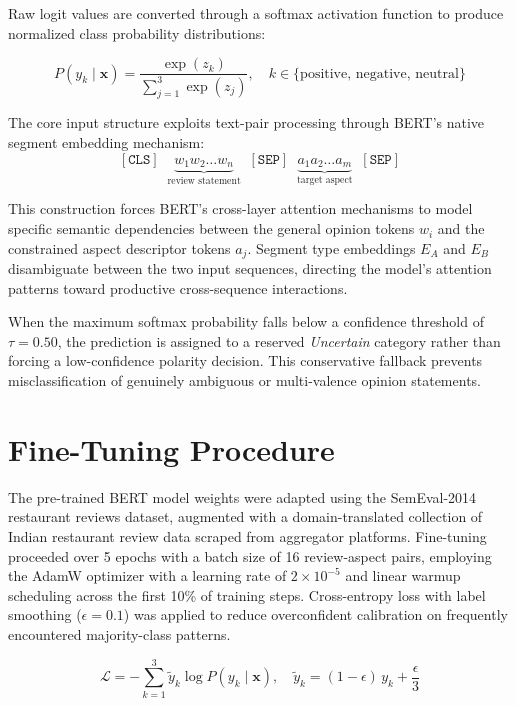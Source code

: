 \documentclass[12pt,a4paper]{report}
\begin{document}
Raw logit values are converted through a softmax activation function to produce normalized class probability distributions:

\begin{equation}
P(y_k \mid \mathbf{x}) = \frac{\exp(z_k)}{\sum_{j=1}^{3} \exp(z_j)}, \quad k \in \{\text{positive, negative, neutral}\}
\end{equation}

The core input structure exploits text-pair processing through BERT's native segment embedding mechanism:
\[
[\texttt{CLS}] \;\; \underbrace{w_1 w_2 \ldots w_n}_{\text{review statement}} \;\;
[\texttt{SEP}] \;\; \underbrace{a_1 a_2 \ldots a_m}_{\text{target aspect}} \;\;
[\texttt{SEP}]
\]

This construction forces BERT's cross-layer attention mechanisms to model specific semantic dependencies between the general opinion tokens $w_i$ and the constrained aspect descriptor tokens $a_j$. Segment type embeddings $E_A$ and $E_B$ disambiguate between the two input sequences, directing the model's attention patterns toward productive cross-sequence interactions.

When the maximum softmax probability falls below a confidence threshold of $\tau = 0.50$, the prediction is assigned to a reserved \textit{Uncertain} category rather than forcing a low-confidence polarity decision. This conservative fallback prevents misclassification of genuinely ambiguous or multi-valence opinion statements.

\section{Fine-Tuning Procedure}
The pre-trained BERT model weights were adapted using the SemEval-2014 restaurant reviews dataset, augmented with a domain-translated collection of Indian restaurant review data scraped from aggregator platforms. Fine-tuning proceeded over 5 epochs with a batch size of 16 review-aspect pairs, employing the AdamW optimizer with a learning rate of $2\times10^{-5}$ and linear warmup scheduling across the first 10\% of training steps. Cross-entropy loss with label smoothing ($\epsilon=0.1$) was applied to reduce overconfident calibration on frequently encountered majority-class patterns.

\begin{equation}
\mathcal{L} = -\sum_{k=1}^{3} \tilde{y}_k \log P(y_k \mid \mathbf{x}), \quad
\tilde{y}_k = (1-\epsilon)\,y_k + \frac{\epsilon}{3}
\end{equation}
\end{document}
